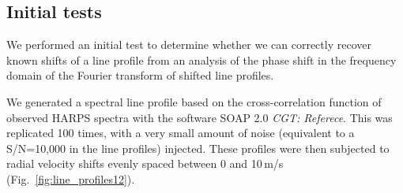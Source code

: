
\subsection{Initial tests}

We performed an initial test to determine whether we can correctly recover known shifts of a line profile  
from an analysis of the phase shift in the frequency domain of the Fourier transform of shifted line profiles.

We generated a spectral line profile based on the cross-correlation function of observed HARPS spectra
with the software SOAP 2.0 {\em CGT: Referece}. This was replicated 100 times, with a very small amount of 
noise (equivalent to a S/N=10,000 in the line profiles) injected. These profiles were then
subjected to radial velocity shifts evenly spaced between 0 and 10\,m/s (Fig.~\ref{fig:line_profiles12}). 

